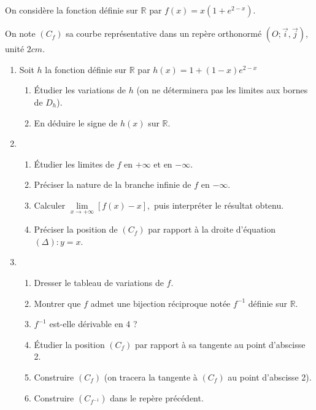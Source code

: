 \section*{}

On considère la fonction définie sur \( \mathbb{R} \) par  \( f(x) = x \left(1 + e^{2-x} \right). \)

On note \( (C_f) \) sa courbe représentative dans un repère orthonormé \( (O; \vec{i}, \vec{j}) \), unité \( 2cm \).

\begin{enumerate}
    \item Soit \( h \) la fonction définie sur \( \mathbb{R} \) par  \( h(x) = 1 + (1 - x)e^{2-x} \)
          \begin{enumerate}
              \item Étudier les variations de \( h \) (on ne déterminera pas les limites aux bornes de \( D_h \)).
              \item En déduire le signe de \( h(x) \) sur \( \mathbb{R} \).
          \end{enumerate}
    \item
          \begin{enumerate}
              \item Étudier les limites de \( f \) en \( +\infty \) et en \( -\infty \).
              \item Préciser la nature de la branche infinie de \( f \) en \( -\infty \).
              \item Calculer  \( \lim\limits_{x \to +\infty} \left[ f(x) - x \right], \) puis interpréter le résultat obtenu.
              \item Préciser la position de \( (C_f) \) par rapport à la droite d’équation \( (\Delta) : y = x \).
          \end{enumerate}
    \item
          \begin{enumerate}
              \item Dresser le tableau de variations de \( f \).
              \item Montrer que \( f \) admet une bijection réciproque notée \( f^{-1} \) définie sur \( \mathbb{R} \).
              \item \( f^{-1} \) est-elle dérivable en 4 ?
              \item Étudier la position \( (C_f) \) par rapport à sa tangente au point d’abscisse 2.
              \item Construire \( (C_f) \) (on tracera la tangente à \( (C_f) \) au point d’abscisse 2).
              \item Construire \( (C_{f^{-1}}) \) dans le repère précédent.
          \end{enumerate}
\end{enumerate}


